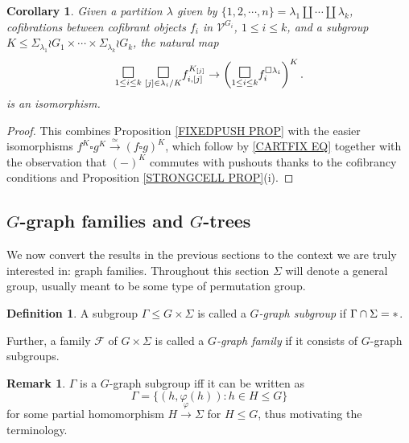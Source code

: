 \documentclass[a4paper,10pt
,draft
]{article}%
\numberwithin{equation}{section}
\numberwithin{figure}{section}
\newtheorem{corollary}[equation]{Corollary}%
\theoremstyle{definition} %
\newtheorem{definition}[equation]{Definition}%
\newtheorem{remark}[equation]{Remark}%
\newcommand{\1}{\ensuremath{\mathbbm 1}}%
\begin{document}
\begin{corollary}\label{FIXEDPUSH COR}
	Given a partition $\lambda$ given by
	$\{1,2,\cdots,n\} = \lambda_1 \amalg \cdots \amalg \lambda_k$, cofibrations between cofibrant objects $f_i$ in $\mathcal{V}^{G_i}$, $1\leq i \leq k$,
	and a subgroup
	$K \leq 
	\Sigma_{\lambda_1} \wr G_1
	\times \cdots \times
	\Sigma_{\lambda_k} \wr G_k
	$,
	the natural map
\[
	\underset{1\leq i\leq k}{\mathlarger{\mathlarger{\square}}}
	\phantom{|}
	\underset{[j] \in \lambda_i/K}{\mathlarger{\mathlarger{\square}}}
	f_{i, [j]}^{K_{[j]}}
\to
	\left( 	\underset{1\leq i\leq k}{\mathlarger{\mathlarger{\square}}}f_i^{\square \lambda_i} \right)^K.
\]
is an isomorphism.
\end{corollary}

\begin{proof}
This combines Proposition \ref{FIXEDPUSH PROP}
with the easier isomorphisms
$f^K \square g^K \xrightarrow{\simeq} 
(f \square g)^K$,
which follow by \eqref{CARTFIX EQ}
together with the observation that $(\minus)^K$
commutes with pushouts thanks to the cofibrancy conditions and Proposition \ref{STRONGCELL PROP}(i).
\end{proof}



\subsection{$G$-graph families and $G$-trees}
\label{G_GRAPH_SECTION}



We now convert the results in the previous sections to the context we are truly interested in:
graph families. 
Throughout this section $\Sigma$ will denote a general group,
usually meant to be some type of permutation group.


\begin{definition}
        \label{GRAPH DEF}
A subgroup $\Gamma \leq G \times \Sigma$ is called a
\textit{$G$-graph subgroup} if $\Gamma \cap \Sigma = \**$. 

Further, a family $\mathcal{F}$ of $G \times \Sigma$ is called a \textit{$G$-graph family} if it consists of $G$-graph subgroups.
\end{definition}

\begin{remark}\label{GRAPH REM}
$\Gamma$ is a $G$-graph subgroup iff it can be written as
\[
	\Gamma = 
	\{
	(h,\varphi(h)) : h \in H \leq G
	\}
\]
for some partial homomorphism $H \xrightarrow{\varphi} \Sigma$
for $H \leq G$, 
thus motivating the terminology.
\end{remark}
\end{document}
